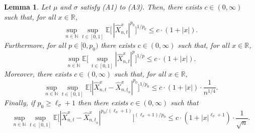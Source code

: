 \documentclass[11pt]{amsart}
\newcommand{\R}{{\mathbb R}}
\newcommand{\N}{{\mathbb N}}
\newcommand{\EE}{{\mathbb E}}
\newcommand{\eul}{{\widehat X}}
\newcommand{\utn}{\underline {t}_n}
\theoremstyle{plain}
\newtheorem{lemma}{Lemma}
\theoremstyle{definition}
\begin{document}
\begin{lemma}\label{eulprop}
Let $\mu$ and $\sigma$ satisfy (A1) to (A3). Then,  there exists $c\in (0,\infty)$ such that, for all $x\in\R$,
\begin{equation}\label{tmg002a}
\sup_{n\in\N}\sup_{t\in[0,1]}\EE\bigl[\,|\eul_{n,t}^{x}|^{p_0}\bigr]^{1/p_0} \leq c\cdot(1+|x|).
\end{equation}
Furthermore, for all $p\in [0,p_0)$  there exists $c\in (0,\infty)$ such that, for  all $x\in\R$,
\begin{equation}\label{tmg003a}
\sup_{n\in\N}\EE\bigl[\,\sup_{t\in[0,1]}|\eul_{n,t}^{x}|^{p}\bigr]^{1/p} \leq c\cdot(1+|x|).
\end{equation}
Moreover,  there exists  $c\in(0, \infty)$ such that, for  all $x\in\R$,
\begin{equation}\label{tmg003b}
	\sup_{n\in\N}\sup_{t\in[0,1]}\EE\bigl[ |\eul_{n,t}^x-\eul_{n,\utn}^x|^{p_0}\bigr]^{1/p_0}\leq c\cdot (1+|x|)\cdot \frac{1}{n^{1/4}}.
\end{equation}
Finally, if $p_0\ge \ell_\sigma+1$ then there exists  $c\in(0, \infty)$ such that
\begin{equation}\label{tmg003}
\sup_{n\in\N}\sup_{t\in[0,1]}\EE\bigl[ |\eul_{n,t}^x-\eul_{n,\utn}^x|^{p_0/(\ell_\sigma+1)}\bigr]^{(\ell_\sigma+1)/p_0}\leq c\cdot (1+|x|^{\ell_\sigma+1})\cdot \frac{1}{\sqrt{n}}.
\end{equation}
\end{lemma}
\end{document}
